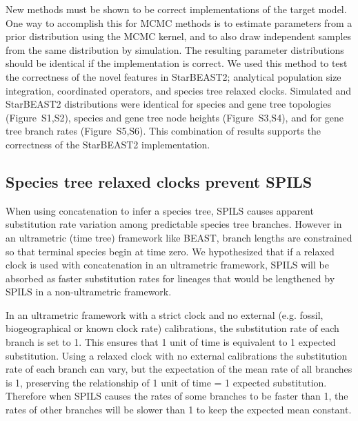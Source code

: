 \documentclass[nogrid]{MBE}%
\begin{document}
New methods must be shown to be correct implementations of the target model.
One way to accomplish this for MCMC methods is to estimate parameters from a
prior distribution using the MCMC kernel, and to also draw independent samples
from the same distribution by simulation. The resulting parameter
distributions should be identical if the implementation is correct. We used
this method to test the correctness of the novel features in StarBEAST2;
analytical population size integration, coordinated operators, and species
tree relaxed clocks. Simulated and StarBEAST2 distributions were identical for
species and gene tree topologies (Figure~S1,S2), species and gene tree node
heights (Figure~S3,S4), and for gene tree branch rates (Figure~S5,S6). This
combination of results supports the correctness of the StarBEAST2
implementation.

\subsection{Species tree relaxed clocks prevent SPILS}

When using concatenation to infer a species tree, SPILS causes apparent
substitution rate variation among predictable species tree branches. However
in an ultrametric (time tree) framework like BEAST, branch lengths are
constrained so that terminal species begin at time zero. We hypothesized that
if a relaxed clock is used with concatenation in an ultrametric framework,
SPILS will be absorbed as faster substitution rates for lineages that would be
lengthened by SPILS in a non-ultrametric framework.

In an ultrametric framework with a strict clock and no external (e.g. fossil,
biogeographical or known clock rate) calibrations, the substitution rate of
each branch is set to 1. This ensures that 1 unit of time is equivalent to 1
expected substitution. Using a relaxed clock with no external calibrations the
substitution rate of each branch can vary, but the expectation of the mean
rate of all branches is 1, preserving the relationship of 1 unit of time = 1
expected substitution. Therefore when SPILS causes the rates of some branches
to be faster than 1, the rates of other branches will be slower than 1 to keep
the expected mean constant.
\end{document}
